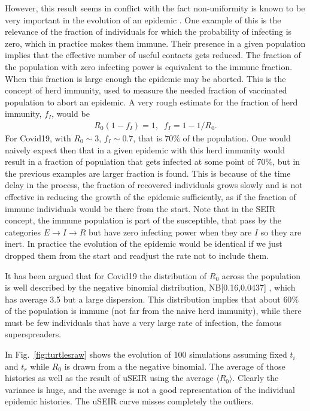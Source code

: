 \documentclass[a4paper,oneside,11pt]{article}
\begin{document}
 However, this result seems in conflict with the fact non-uniformity is known to be very important in the evolution of an epidemic \cite{}. One example of this is the relevance of the fraction of individuals for which the probability of infecting is zero, which in practice makes them immune. Their presence in a given population implies that the effective number of useful contacts gets reduced. The fraction of the population with zero infecting power is equivalent to the immune fraction. When this fraction is large enough  the epidemic may be aborted. This is the concept of herd immunity, used to measure the needed fraction of vaccinated population to abort an epidemic. A very rough estimate for the fraction of herd immunity, $f_I$, would be
   \begin{eqnarray}
  R_0 (1- f_I)  =1, \;\; f_I= 1-1/R_0.
   \end{eqnarray}
   For Covid19, with $R_0 \sim 3$, $f_I \sim 0.7$, that is $70\%$ of the population. One would naively expect then that in a given epidemic with this herd immunity would result in a fraction of  population that gets infected at some point of 70$\%$, but in the previous examples are larger fraction is found. This is because of the time delay in the process, the fraction of recovered individuals grows slowly and is not effective in reducing the growth of the epidemic sufficiently, as if the fraction of immune individuals would be there from the start. Note that in the SEIR concept, the immune population is part of the susceptible, that pass by the categories $E\rightarrow I \rightarrow R$ but have zero infecting power when they are $I$ so they are inert. In practice the evolution of the epidemic would be identical if we just dropped them from the start and readjust the rate not to include them. 
 
  It has been argued that for Covid19 the distribution of $R_0$ across the population is well described by the negative binomial distribution, NB[0.16,0.0437] \cite{LloydSmithNovember2020}, which has average 3.5 but a large dispersion. This distribution implies that about $60\%$ of the population is immune  (not far from the naive herd immunity), while there must be few individuals that have a very large rate of infection, the famous superspreaders.

  In Fig.~\ref{fig:turtlesraw} shows the evolution of 100 simulations assuming fixed $t_i$ and $t_r$ while $R_0$ is drawn from a the negative binomial. The average of those histories as well as the result of
  uSEIR using the average $\langle R_0\rangle$. Clearly the variance is huge, and the average is not a good representation of the individual epidemic histories. The uSEIR curve misses completely the outliers.
\end{document}
